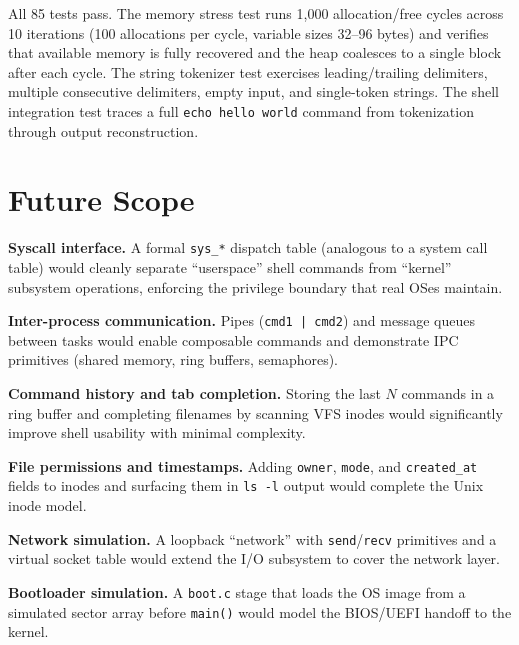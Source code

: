 \documentclass[conference]{IEEEtran}
\begin{document}
All 85 tests pass. The memory stress test runs 1{,}000 allocation/free cycles across 10 iterations (100 allocations per cycle, variable sizes 32--96 bytes) and verifies that available memory is fully recovered and the heap coalesces to a single block after each cycle. The string tokenizer test exercises leading/trailing delimiters, multiple consecutive delimiters, empty input, and single-token strings. The shell integration test traces a full \texttt{echo hello world} command from tokenization through output reconstruction.

\section{Future Scope}

\textbf{Syscall interface.} A formal \texttt{sys\_*} dispatch table (analogous to a system call table) would cleanly separate ``userspace'' shell commands from ``kernel'' subsystem operations, enforcing the privilege boundary that real OSes maintain.

\textbf{Inter-process communication.} Pipes (\texttt{cmd1 | cmd2}) and message queues between tasks would enable composable commands and demonstrate IPC primitives (shared memory, ring buffers, semaphores).

\textbf{Command history and tab completion.} Storing the last $N$ commands in a ring buffer and completing filenames by scanning VFS inodes would significantly improve shell usability with minimal complexity.

\textbf{File permissions and timestamps.} Adding \texttt{owner}, \texttt{mode}, and \texttt{created\_at} fields to inodes and surfacing them in \texttt{ls -l} output would complete the Unix inode model.

\textbf{Network simulation.} A loopback ``network'' with \texttt{send}/\texttt{recv} primitives and a virtual socket table would extend the I/O subsystem to cover the network layer.

\textbf{Bootloader simulation.} A \texttt{boot.c} stage that loads the OS image from a simulated sector array before \texttt{main()} would model the BIOS/UEFI handoff to the kernel.
\end{document}
